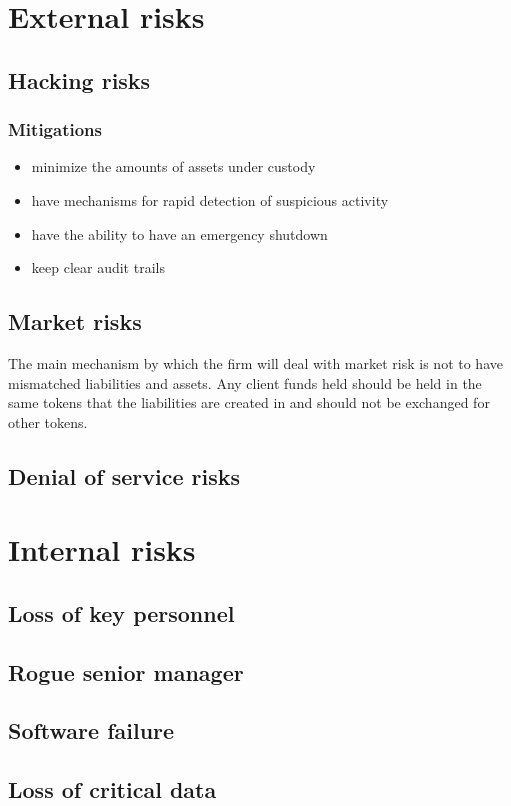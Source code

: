 \section{External risks}

\subsection{Hacking risks}
\subsubsection{Mitigations}
\begin{itemize}
\item minimize the amounts of assets under custody
\item have mechanisms for rapid detection of suspicious activity
\item have the ability to have an emergency shutdown
  \item keep clear audit trails
\end{itemize}
\subsection{Market risks}

The main mechanism by which the firm will deal with market risk is not
to have mismatched liabilities and assets.  Any client funds held
should be held in the same tokens that the liabilities are created in
and should not be exchanged for other tokens.

\subsection{Denial of service risks}
\section{Internal risks}
\subsection{Loss of key personnel}
\subsection{Rogue senior manager}
\subsection{Software failure}
\subsection{Loss of critical data}

